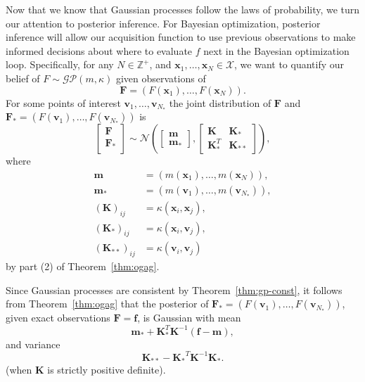 Now that we know that Gaussian processes follow the laws of probability, we turn our attention to posterior inference.
For Bayesian optimization, posterior inference will allow our acquisition function to use previous observations to make informed decisions about where to evaluate $f$ next in the Bayesian optimization loop.
Specifically, for any $N \in \mathbb{Z}^{+}$, and $\mathbf{x}_1, \dots, \mathbf{x}_N \in \mathcal{X}$, we want to quantify our belief of $F \sim \mathcal{GP}(m, \kappa)$
given observations of
\begin{equation*}
    \mathbf{F} = (F(\mathbf{x}_1), \dots, F(\mathbf{x}_N)).
\end{equation*}
For some points of interest $\mathbf{v}_{1}, \dots, \mathbf{v}_{N_{*}}$
the joint distribution of $\mathbf{F}$ and $\mathbf{F}_* = (F(\mathbf{v}_1), \dots, F(\mathbf{v}_{N_*}))$ is
\begin{equation*}
    \begin{bmatrix}
        \mathbf{F} \\
        \mathbf{F}_{*} \\
    \end{bmatrix}
    \sim
    \mathcal{N}\left(
    \begin{bmatrix}
            \mathbf{m} \\
            \mathbf{m}_{*}
        \end{bmatrix}
    ,
    \begin{bmatrix}
            \mathbf{K} & \mathbf{K}_* \\
            \mathbf{K}_*^T & \mathbf{K}_{* *}
        \end{bmatrix}
    \right),
\end{equation*}
where
\begin{align*}
    \mathbf{m} & = (m(\mathbf{x}_1), \dots, m(\mathbf{x}_N)), \\
    \mathbf{m_*} & = (m(\mathbf{v}_1), \dots, m(\mathbf{v}_{N_{*}})), \\
    (\mathbf{K})_{ij} & = \kappa(\mathbf{x}_i, \mathbf{x}_j), \\
    (\mathbf{K}_*)_{ij} & = \kappa(\mathbf{x}_i, \mathbf{v}_j), \\
    (\mathbf{K}_{* *})_{ij} & = \kappa(\mathbf{v}_i, \mathbf{v}_j)
\end{align*}
by part (2) of Theorem~\ref{thm:ogag}.

Since Gaussian processes are consistent by Theorem~\ref{thm:gp-const}, it follows from Theorem~\ref{thm:ogag} that the posterior
of $\mathbf{F}_* = (F(\mathbf{v}_1), \dots, F(\mathbf{v}_{N_*}))$, given exact observations $\mathbf{F} = \mathbf{f}$, is Gaussian with mean
\begin{equation}
    \label{eq:noisless-post-mean}
    \mathbf{m}_* + \mathbf{K}_*^T \mathbf{K}^{-1} (\mathbf{f} - \mathbf{m}),
\end{equation}
and variance
\begin{equation}
    \label{eq:noiseless-post-var}
    \mathbf{K}_{* *} - \mathbf{K_*}^{T} \mathbf{K}^{-1} \mathbf{K_*}.
\end{equation}
(when $\mathbf{K}$ is strictly positive definite).

